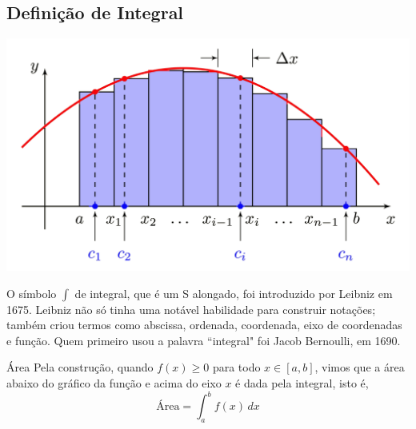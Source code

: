 \subsection*{Definição de Integral}
\begin{frame}[label=def_integral]





\begin{center}
	\includegraphics[scale=0.15]{capa3.png}
\end{center}
\end{frame}

\begin{frame}[label=def_integral]
\begin{block}{ }
O símbolo $\int$ de integral, que é um S alongado, foi introduzido por Leibniz em 1675. Leibniz não só tinha uma notável habilidade para construir notações; também criou termos como abscissa, ordenada, coordenada, eixo de coordenadas e função.  Quem primeiro usou a palavra ``integral" foi Jacob Bernoulli, em 1690.
\end{block}

\begin{block}{Área}
Pela construção,  quando $f(x)\geq 0$ para todo $x\in [a,b]$, vimos que a área abaixo do gráfico da função e acima do eixo $x$ é dada pela integral, isto é,
\[\text{Área}=\int_a^bf(x)\,dx\]
\end{block}
\end{frame}





